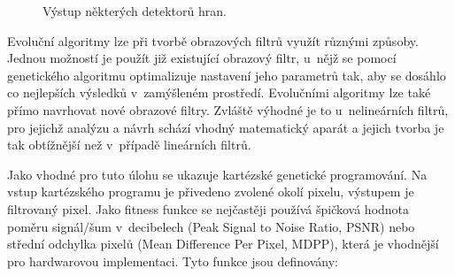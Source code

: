 \begin{figure}[htb]
    \centering
    \caption{Výstup některých detektorů hran.}
    \label{obrDetektor}
\end{figure}



Evoluční algoritmy lze při tvorbě obrazových filtrů využít různými způsoby. Jednou možností je použít již existující obrazový filtr, u~nějž se pomocí genetického algoritmu optimalizuje nastavení jeho parametrů tak, aby se dosáhlo co nejlepších výsledků v~zamýšleném prostředí. Evolučními algoritmy lze také přímo navrhovat nové obrazové filtry. Zvláště výhodné je to u~nelineárních filtrů, pro jejichž analýzu a návrh schází vhodný matematický aparát a jejich tvorba je tak obtížnější než v~případě lineárních filtrů.

Jako vhodné pro tuto úlohu se ukazuje kartézské genetické programování. Na vstup kartézského programu je přivedeno zvolené okolí pixelu, výstupem je filtrovaný pixel. Jako fitness funkce se nejčastěji používá špičková hodnota poměru signál/šum v~decibelech (Peak Signal to Noise Ratio, PSNR) nebo střední odchylka pixelů (Mean Difference Per Pixel, MDPP), která je vhodnější pro hardwarovou implementaci. Tyto funkce jsou definovány:

